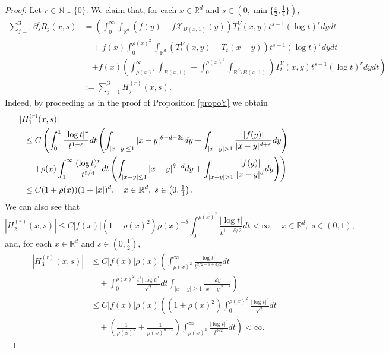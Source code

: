 \documentclass[10pt, a4paper, reqno]{amsart}
\theoremstyle{definition}
\theoremstyle{remark}
\numberwithin{equation}{section}
\begin{document}
\begin{proof}
Let $r\in \mathbb N\cup\{0\}$. We claim that, for each $x\in \mathbb R^d$ and $s\in (0,\min\{\frac{\varepsilon}{2}, \frac{1}{4}\})$,
\begin{align}\label{sumH}
    \sum_{j=1}^3\partial _s^rR_j(x,s)&=\left(\int_0^\infty \int_{\mathbb R^d}(f(y)-f\mathcal X_{B(x,1)}(y))T_t^V(x,y)t^{s-1}(\log t)^rdydt\right.\nonumber\\
&\quad +f(x)\int_0^{\rho (x)^2}\int_{\mathbb R^d}(T_t^V(x,y)-T_t(x-y))t^{s-1}(\log t)^rdydt\nonumber\\
&\quad \left.+f(x)\left(\int_{\rho (x)^2}^\infty\int_{B(x,1)}-\int_0^{\rho (x)^2}\int_{\mathbb R^d\setminus B(x,1)} \right)T_t^V(x,y)t^{s-1}(\log t)^rdydt\right)\nonumber\\
&:=\sum_{j=1}^3H_j^{(r)}(x,s).
\end{align}
Indeed, by proceeding as in the proof of Proposition \ref{propoY} we obtain
\begin{align*}
|H_1^{(r)}(x,s)|&\\
&\hspace{-1.5cm}\leq C\left(\int_0^1\frac{|\log t|^r}{t^{1-\varepsilon}}dt\left(\int_{|x-y|\leq 1}|x-y|^{\theta -d-2\varepsilon}dy+\int_{|x-y|>1}\frac{|f(y)|}{|x-y|^{d+\varepsilon}}dy\right)\right.\\
 &\hspace{-1.5cm}\left.\quad +\rho (x)\int_1^\infty \frac{(\log t)^r}{t^{5/4}}dt\left(\int_{|x-y|\leq 1}|x-y|^{\theta -d}dy+\int_{|x-y|>1}\frac{|f(y)|}{|x-y|^d}dy\right)\right)\\
 &\hspace{-1.5cm}\leq C(1+\rho (x))(1+|x|)^d,\quad x\in \mathbb R^d,\;s\in \left(0,\tfrac{1}{4}\right).
\end{align*}
We can also see that
\[
|H_2^{(r)}(x,s)|\leq C|f(x)|(1+\rho (x)^2)\rho (x)^{-\delta}\int_0^{\rho (x)^2}\frac{|\log t|}{t^{1-\delta/2}}dt<\infty,\quad x\in \mathbb R^d,\;s\in (0,1),
\]
and, for each $x\in \mathbb R^d$ and $s\in (0,\tfrac{1}{2})$,
\begin{align*}
|H_3^{(r)}(x,s)|&\leq C|f(x)|\rho (x)\left(\int_{\rho (x)^2}^\infty \frac{|\log t|^r}{t^{d/2-s+3/2}}dt\right.\\
&\left.\quad +\int_0^{\rho (x)^2}\frac{t^s|\log t|^r}{\sqrt{t}}dt\int_{|x-y|\geq 1}\frac{dy}{|x-y|^{d+2}}\right)\\
&\leq C|f(x)|\rho (x)\left((1+\rho (x)^2)\int_0^{\rho(x)^2}\frac{|\log t|^r}{\sqrt{t}}dt\right.\\
&\left.\quad+\left(\frac{1}{\rho (x)^d}+\frac{1}{\rho (x)^{d-1}}\right)\int_{\rho(x)^2}^\infty\frac{|\log t|^r}{t^{3/2}}dt\right)<\infty .

\end{align*}
\end{proof}
\end{document}
